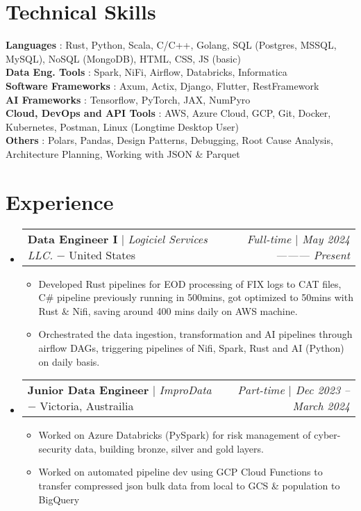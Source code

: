 \documentclass[letterpaper,10pt]{article}
\makeatletter
\newcommand{\sectionspace}{
\vspace{-15pt}
}
\newcommand{\subheadingtitlevspace}{
\vspace{-3pt}
}
\newcommand{\resumeItem}[1]{
  \item{
    {#1 \vspace{-4pt}}
  }
}
\newcommand{\titleItem}[1]{
  \textbf{#1}
}
\newcommand{\resumeProjectHeading}[2]{
    \item
    \begin{tabular*}{0.97\textwidth}{l@{\extracolsep{\fill}}r}
      #1 & \textit{ #2} \\
    \end{tabular*}\vspace{-9pt}
}
\newcommand{\resumeSubHeadingListStart}{\subheadingtitlevspace\begin{itemize}[leftmargin=0.15in, label={}]}
\newcommand{\resumeSubHeadingListEnd}{\end{itemize}}
\newcommand{\resumeItemListStart}{
\begin{itemize}}
\newcommand{\resumeItemListEnd}{
\vspace{4pt}
\end{itemize}\vspace{-8pt}}
\makeatother
\begin{document}
\section{Technical Skills}
\subheadingtitlevspace
\begin{itemize}[leftmargin=0.15in, label={}]
	{\item{
          \titleItem{Languages}{: Rust, Python, Scala, C/C++, Golang, SQL (Postgres, MSSQL,
          MySQL), NoSQL (MongoDB), HTML, CSS, JS (basic)} \\
          \titleItem{Data Eng. Tools}{: Spark, NiFi, Airflow, Databricks, Informatica}\\
          \titleItem{Software Frameworks}{: Axum, Actix, Django, Flutter, RestFramework}\\
          \titleItem{AI Frameworks}{: Tensorflow, PyTorch, JAX, NumPyro}\\
          \titleItem{Cloud, DevOps and API Tools}{: AWS, Azure Cloud, GCP, Git,
          Docker, Kubernetes, Postman, Linux (Longtime Desktop User)} \\
          \titleItem{Others}{: Polars, Pandas, Design Patterns, Debugging, Root
          Cause Analysis, Architecture Planning, Working with JSON \& Parquet}
	}}
\end{itemize}
\sectionspace





\section{Experience}
\resumeSubHeadingListStart
\resumeProjectHeading
{\titleItem{{Data Engineer I}} $|$ \emph{Logiciel Services LLC.} $-$ \small{United States}}{\small{Full-time} $|$ May 2024 --------- Present}
\resumeItemListStart
\resumeItem{Developed Rust pipelines for EOD processing of FIX logs to CAT
files, C\# pipeline previously running in 500mins, got optimized to 50mins with
Rust \& Nifi, saving around 400 mins daily on AWS machine.} 
\resumeItem{Orchestrated the data ingestion, transformation and AI pipelines
through airflow DAGs, triggering pipelines of Nifi, Spark, Rust and AI (Python)
on daily basis.}
\resumeItemListEnd
\resumeSubHeadingListEnd


\resumeSubHeadingListStart
\resumeProjectHeading
{\titleItem{{Junior Data Engineer}} $|$ \emph{ImproData} $-$ \small{Victoria, Austrailia}}{ \small{Part-time} $|$ Dec 2023 -- March 2024 }
\resumeItemListStart
\resumeItem{Worked on Azure Databricks (PySpark) for risk management of
cyber-security data, building bronze, silver and gold layers.}
\resumeItem{Worked on automated pipeline dev using GCP Cloud Functions to
transfer compressed json bulk data from local to GCS \& population to BigQuery}
\resumeItemListEnd
\resumeSubHeadingListEnd
\end{document}

